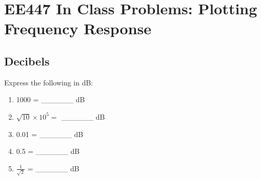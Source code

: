 \documentclass{article}	%
\newcommand{\EEcourse}{EE447 }
\begin{document}
%
%
%




\newpage
\section{\EEcourse In Class Problems: Plotting Frequency Response}
\subsection{Decibels}


Express the following in dB:
\begin{enumerate}
	\item 1000 = \_\_\_\_\_\_ dB
	\item $\sqrt{10}\times10^5 = $ \_\_\_\_\_\_ dB
	\item 0.01   = \_\_\_\_\_\_ dB
	\item 0.5 = \_\_\_\_\_\_ dB
	\item $\frac{1}{\sqrt{2}}$ = \_\_\_\_\_\_ dB
\end{enumerate}

%
%
\end{document}
